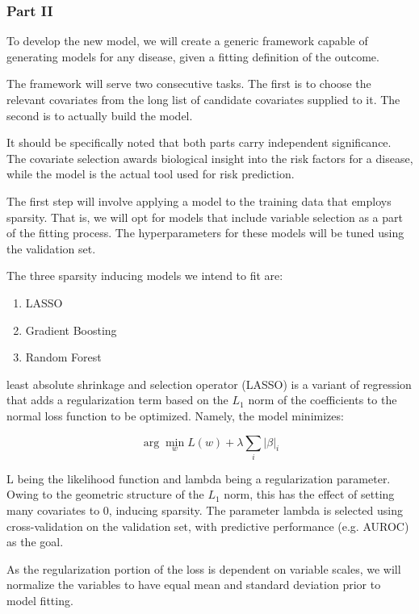 \documentclass[a4paper,12pt]{article}
\begin{document}
		\subsubsection{Part II}
		
		To develop the new model, we will create a generic framework capable of generating models for any disease, given a fitting definition of the outcome.
		
		The framework will serve two consecutive tasks. The first is to choose the relevant covariates from the long list of candidate covariates supplied to it. The second is to actually build the model.
		
		It should be specifically noted that both parts carry independent significance. The covariate selection awards biological insight into the risk factors for a disease, while the model is the actual tool used for risk prediction.
		
		The first step will involve applying a model to the training data that employs sparsity. That is, we will opt for models that include variable selection as a part of the fitting process. The hyperparameters for these models will be tuned using the validation set.
		
		The three sparsity inducing models we intend to fit are:
		\begin{enumerate}
			\item LASSO\cite{Tibshirani2011}
			\item Gradient Boosting\cite{Freund1997}
			\item Random Forest\cite{Breiman2001}
		\end{enumerate}
		
		least absolute shrinkage and selection operator (LASSO) is a variant of regression that adds a regularization term based on the $ L_1 $ norm of the coefficients to the normal loss function to be optimized. Namely, the model minimizes:
		
		\begin{equation*}
		\arg \min_w L(w) + \lambda \sum_{i}|\beta|_i
		\end{equation*}
		
		L being the likelihood function and lambda being a regularization parameter. Owing to the geometric structure of the $ L_1 $ norm, this has the effect of setting many covariates to 0, inducing sparsity. The parameter lambda is selected using cross-validation on the validation set, with predictive performance (e.g. AUROC) as the goal.
		
		As the regularization portion of the loss is dependent on variable scales, we will normalize the variables to have equal mean and standard deviation prior to model fitting.
		
\end{document}
